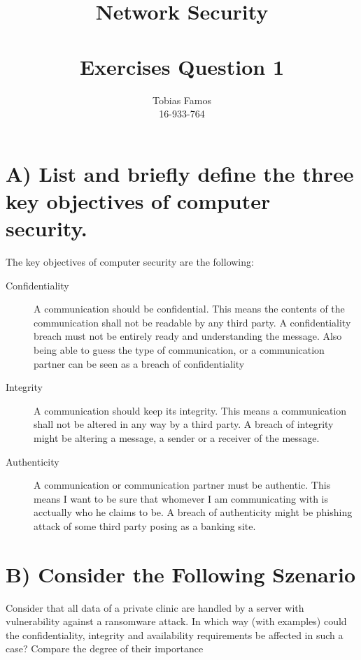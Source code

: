 \documentclass[11pt,a4paper]{article}
\title{Network Security \\ ~\\ \Large{Exercises Question 1}}
\author{Tobias Famos\\ 16-933-764}
\begin{document}
    \maketitle
    \section*{A) List and briefly define the three key objectives of computer security.}
    The key objectives of computer security are the following:
    \begin{description}
        \item [Confidentiality] A communication should be confidential.
        This means the contents of the communication shall not be readable by any third party.
        A confidentiality breach must not be entirely ready and understanding the message.
        Also being able to guess the type of communication, or a communication partner can be seen as a breach of confidentiality
        \item[Integrity] A communication should keep its integrity.
        This means a communication shall not be altered in any way by a third party.
        A breach of integrity might be altering a message, a sender or a receiver of the message.
        \item[Authenticity] A communication or communication partner must be authentic.
        This means I want to be sure that whomever I am communicating with is acctually who he claims to be.
        A breach of authenticity might be phishing attack of some third party posing as a banking site.
    \end{description}

    \section*{B)  Consider the Following Szenario}
    Consider that all data of a private clinic are handled by a server with vulnerability against a ransomware attack.
    In which way (with examples) could the confidentiality, integrity and availability requirements be affected in such a case?
    Compare the degree of their importance
\end{document}
